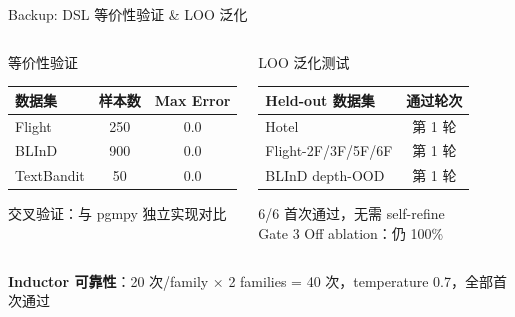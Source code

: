 \documentclass[aspectratio=169,10pt]{beamer}
\newcommand{\pos}[1]{\textcolor{positive}{#1}}
\begin{document}
\begin{frame}{Backup: DSL 等价性验证 \& LOO 泛化}
\vspace{2pt}

\begin{columns}[T]
\begin{exampleblock}{等价性验证}
{\small
\begin{tabular}{@{}lcc@{}}
\toprule
数据集 & 样本数 & Max Error \\
\midrule
Flight & 250 & \pos{0.0} \\
BLInD & 900 & \pos{0.0} \\
TextBandit & 50 & \pos{0.0} \\
\bottomrule
\end{tabular}

\vspace{4pt}
交叉验证：与 pgmpy 独立实现对比
}
\end{exampleblock}

\begin{exampleblock}{LOO 泛化测试}
{\small
\begin{tabular}{@{}lc@{}}
\toprule
Held-out 数据集 & 通过轮次 \\
\midrule
Hotel & 第 1 轮 \\
Flight-2F/3F/5F/6F & 第 1 轮 \\
BLInD depth-OOD & 第 1 轮 \\
\bottomrule
\end{tabular}

\vspace{4pt}
6/6 首次通过，无需 self-refine\\
Gate 3 Off ablation：仍 100\%
}
\end{exampleblock}
\end{columns}

\vspace{6pt}
\textbf{Inductor 可靠性}：20 次/family × 2 families = 40 次，temperature 0.7，全部首次通过
\end{frame}
\end{document}
